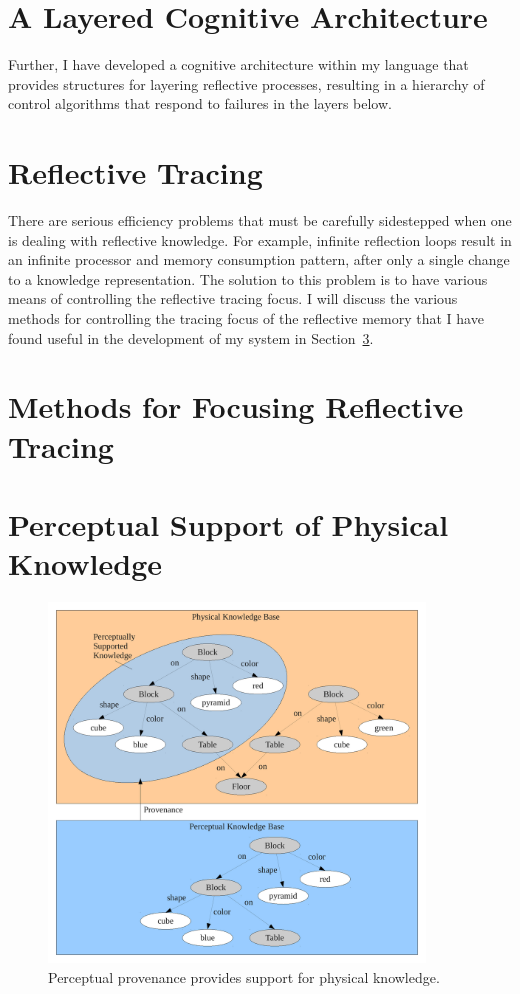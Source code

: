 \section{A Layered Cognitive Architecture}

Further, I have developed a cognitive architecture within my
language that provides structures for layering reflective processes,
resulting in a hierarchy of control algorithms that respond to
failures in the layers below.


\section{Reflective Tracing}
\label{sec:reflective_tracing}

There are serious efficiency problems that must be carefully
sidestepped when one is dealing with reflective knowledge.  For
example, infinite reflection loops result in an infinite processor and
memory consumption pattern, after only a single change to a knowledge
representation.  The solution to this problem is to have various means
of controlling the reflective tracing focus.  I will discuss the
various methods for controlling the tracing focus of the reflective
memory that I have found useful in the development of my system in
Section~\ref{sec:methods_for_focusing_reflective_tracing}.


\section{Methods for Focusing Reflective Tracing}
\label{sec:methods_for_focusing_reflective_tracing}


\section{Perceptual Support of Physical Knowledge}

\begin{figure}[bth]
  \center
  \includegraphics[width=10cm]{gfx/physical_perception}
  \caption[Perceptual provenance provides support for physical knowledge]{Perceptual provenance provides support for physical knowledge.}
  \label{fig:physical_perception}
\end{figure}

